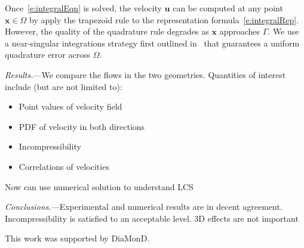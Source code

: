 \documentclass[twocolumn,showpacs,pre,preprintnumbers,floatfix]{revtex4-1}
\newcommand{\uu}{{\mathbf{u}}}
\newcommand{\xx}{{\mathbf{x}}}
\begin{document}
Once~\eqref{e:integralEqn} is solved, the velocity $\uu$ can be computed
at any point $\xx \in \Omega$ by apply the trapezoid rule to the
representation formula~\eqref{e:integralRep}.  However, the quality of
the quadrature rule degrades as $\xx$ approaches $\Gamma$.  We use a
near-singular integrations strategy first outlined
in~\cite{bir:yin:zor2004} that guarantees a uniform quadrature error
across $\Omega$.



{\em Results.}---We compare the flows in the two geometries.
Quantities of interest include (but are not limited to):
\begin{itemize}
  \item Point values of velocity field
  \item PDF of velocity in both directions
  \item Incompressibility
  \item Correlations of velocities
\end{itemize}

Now can use numerical solution to understand LCS


{\em Conclusions.}---Experimental and numerical results are in decent
agreement.  Incompressibility is satisfied to an acceptable level.  3D
effects are not important



This work was supported by DiaMonD.



\end{document}
